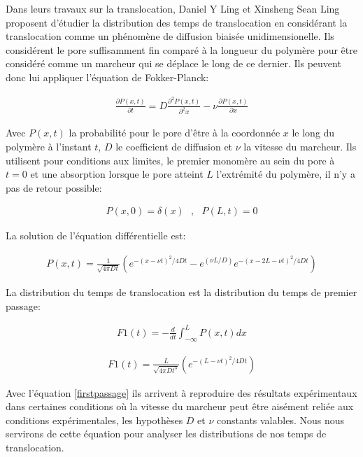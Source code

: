 Dans leurs travaux sur la translocation, Daniel Y Ling et Xinsheng Sean Ling \cite{Ling2013} proposent d'étudier la distribution des temps de translocation en considérant la translocation comme un phénomène de diffusion biaisée unidimensionelle. Ils considérent le pore suffisamment fin comparé à la longueur du polymère pour être considéré comme un marcheur qui se déplace le long de ce dernier. Ils peuvent donc lui appliquer l'équation de Fokker-Planck:

\begin{eqnarray}
\frac{\partial P(x,t)}{\partial t} =   D\frac{\partial ^2 P(x,t)}{\partial ^2 x} - \nu \frac{\partial  P(x,t)}{\partial  x}
\label{equfokkerplank}
\end{eqnarray}

Avec $P(x,t)$ la probabilité pour le pore d'être à la coordonnée $x$ le long du polymère à l'instant $t$, $D$ le coefficient de diffusion et $\nu$ la vitesse du marcheur. Ils utilisent pour conditions aux limites, le premier monomère au sein du pore à $t=0$ et une absorption lorsque le pore atteint $L$ l'extrémité du polymère, il n'y a pas de retour possible:

\begin{eqnarray}
 P(x,0) =   \delta(x)\text{  }, \text{  } P(L,t)=0
\label{condlim}
\end{eqnarray}

La solution de l'équation différentielle est:

\begin{eqnarray}
 P(x,t) = \frac{1}{\sqrt{4\pi D t}} \left(e^{-\left(x-\nu t\right)^{2}/4Dt} -e^{(\nu L/D)}e^{-\left(x-2L-\nu t\right)^{2}/4Dt} \right)
\label{equfokkerplanksol}
\end{eqnarray}

La distribution du temps de translocation est la distribution du temps de premier passage:

\begin{eqnarray}
 F1(t) = -\frac{d}{dt}\int_{-\infty}^L  P(x,t) dx
\label{firstpassageint}
\end{eqnarray}

\begin{eqnarray}
 F1(t) = \frac{L}{\sqrt{4\pi D t^3}} \left(e^{-\left(L-\nu t\right)^{2}/4Dt}\right)
\label{firstpassage}
\end{eqnarray}

Avec l'équation \ref{firstpassage} ils arrivent à reproduire des résultats expérimentaux dans certaines conditions où la vitesse du marcheur peut être aisément reliée aux conditions expérimentales, les hypothèses $D$ et $\nu$ constants valables. Nous nous servirons de cette équation pour analyser les distributions de nos temps de translocation.


